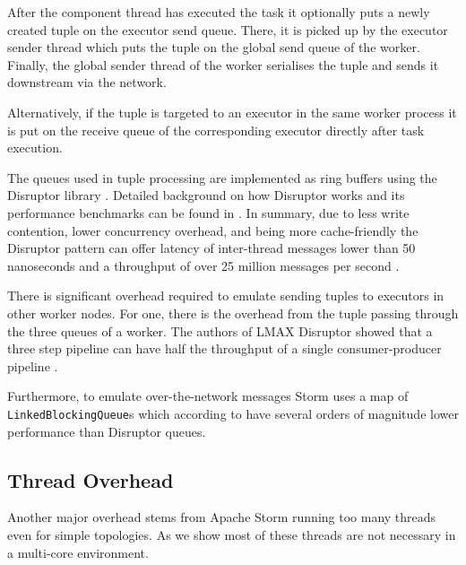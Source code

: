 After the component thread has executed the task it optionally puts a newly created tuple on the executor send queue. There, it is picked up by the executor sender thread which puts the tuple on the global send queue of the worker. Finally, the global sender thread of the worker serialises the tuple and sends it downstream via the network.

Alternatively, if the tuple is targeted to an executor in the same worker process it is put on the receive queue of the corresponding executor directly after task execution.

The queues used in tuple processing are implemented as ring buffers using the Disruptor library \citep{LMAXDisruptor}. Detailed background on how Disruptor works and its performance benchmarks can be found in \citep{Thompson_Farley_Barker_Gee_Stewart_2011}. In summary, due to less write contention, lower concurrency overhead, and being more cache-friendly the Disruptor pattern can offer latency of inter-thread messages lower than 50 nanoseconds and a throughput of over 25 million messages per second \cite{Thompson_Farley_Barker_Gee_Stewart_2011}.

There is significant overhead required to emulate sending tuples to executors in other worker nodes. For one, there is the overhead from the tuple passing through the three queues of a worker. The authors of LMAX Disruptor showed that a three step pipeline can have half the throughput of a single consumer-producer pipeline \citep{DisruptorWiki}.

Furthermore, to emulate over-the-network messages Storm uses a map of \\ \texttt{LinkedBlockingQueue}s which according to \cite{Thompson_Farley_Barker_Gee_Stewart_2011} have several orders of magnitude lower performance than Disruptor queues.

\subsection{Thread Overhead}

Another major overhead stems from Apache Storm running too many threads even for simple topologies. As we show most of these threads are not necessary in a multi-core environment.

